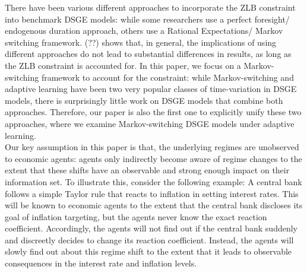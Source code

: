 \documentclass[12pt,reqno]{article}
\numberwithin{equation}{section}
\begin{document}
There have been various different approaches to incorporate the ZLB constraint into benchmark DSGE models: while some researchers use a perfect foresight/ endogenous duration approach, others use a Rational Expectations/ Markov switching framework. (??) shows that, in general, the implications of using different approaches do not lead to substantial differences in results, as long as the ZLB constraint is accounted for. In this paper, we focus on a Markov-switching framework to account for the constraint: while Markov-switching and adaptive learning have been two very popular classes of time-variation in DSGE models, there is surprisingly little work on DSGE models that combine both approaches. Therefore, our paper is also the first one to explicitly unify these two approaches, where we examine Markov-switching DSGE models under adaptive learning. \\

Our key assumption in this paper is that, the underlying regimes are unobserved to economic agents: agents only indirectly become aware of regime changes to the extent that these shifts have an observable and strong enough impact on their information set. To illustrate this, consider the following example: A central bank follows a simple Taylor rule that reacts to inflation in setting interest rates. This will be known to economic agents to the extent that the central bank discloses its goal of inflation targeting, but the agents never know the exact reaction coefficient. Accordingly, the agents will not find out if the central bank suddenly and discreetly decides to change its reaction coefficient. Instead, the agents will slowly find out about this regime shift to the extent that it leads to observable consequences in the interest rate and inflation levels. \\
\end{document}
